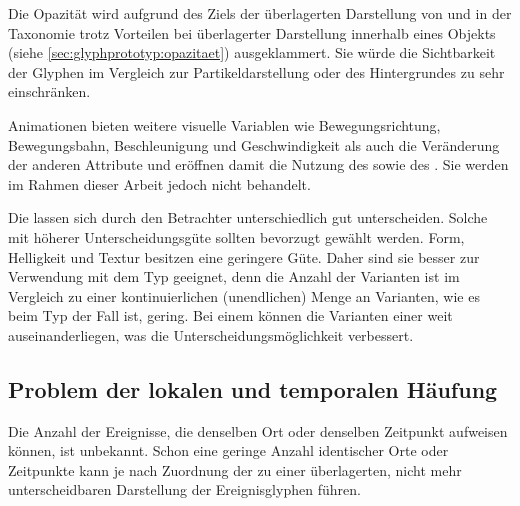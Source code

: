 Die Opazität wird aufgrund des Ziels der überlagerten Darstellung von  und  in der Taxonomie trotz Vorteilen bei überlagerter Darstellung innerhalb eines Objekts (siehe \autoref{sec:glyphprototyp:opazitaet}) ausgeklammert. Sie würde die Sichtbarkeit der Glyphen im Vergleich zur Partikeldarstellung oder des Hintergrundes zu sehr einschränken.

Animationen bieten weitere visuelle Variablen wie Bewegungsrichtung, Bewegungsbahn, Beschleunigung und Geschwindigkeit als auch die Veränderung der anderen Attribute und eröffnen damit die Nutzung des  sowie des . Sie werden im Rahmen dieser Arbeit jedoch nicht behandelt.

Die  lassen sich durch den Betrachter unterschiedlich gut unterscheiden.
Solche mit höherer Unterscheidungsgüte sollten bevorzugt gewählt werden. Form, Helligkeit und Textur besitzen eine geringere Güte. Daher sind sie besser zur Verwendung mit dem Typ  geeignet, denn die Anzahl der Varianten ist im Vergleich zu einer kontinuierlichen (unendlichen) Menge an Varianten, wie es beim Typ  der Fall ist, gering. Bei einem  können die Varianten einer  weit auseinanderliegen, was die Unterscheidungsmöglichkeit verbessert.

\subsection*{Problem der lokalen und temporalen Häufung}\label{sec:strukturereignistaxonomie:haeufung}
Die Anzahl der Ereignisse, die denselben Ort oder denselben Zeitpunkt aufweisen können, ist unbekannt. Schon eine geringe Anzahl identischer Orte oder Zeitpunkte kann je nach Zuordnung der  zu einer überlagerten, nicht mehr unterscheidbaren Darstellung der Ereignisglyphen führen.

